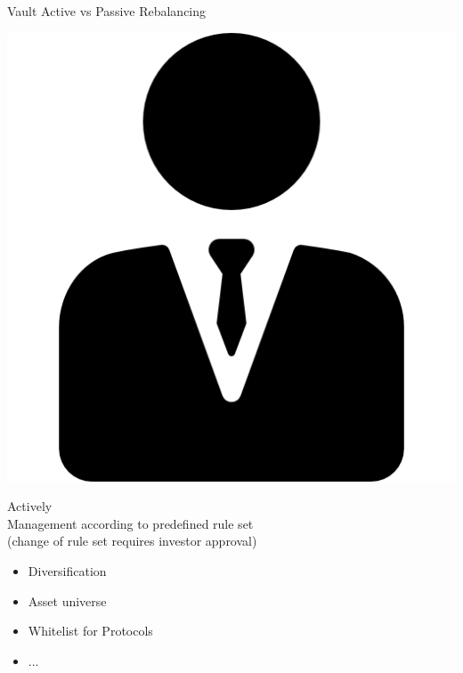 \documentclass[handout]{beamer}
\begin{document}
\begin{frame}{Vault Active vs Passive Rebalancing}
	\begin{minipage}{0.4\textwidth}
		\begin{center}
			\includegraphics[scale=0.18]{../assets/images/manager.png}
		\end{center}
		\begin{center}
		Actively \\ \vspace{1em}
		Management according to predefined rule set \\ {\footnotesize (change of rule set requires investor approval)}
\vspace{0.5em}		
			\begin{scriptsize}
				\begin{itemize}
					\item<1-> Diversification
					\item<2-> Asset universe
					\item<3-> Whitelist for Protocols
					\item<4-> ...
				\end{itemize}		
			\end{scriptsize}
		\end{center}		
	\end{minipage}
	\hfill
	\begin{minipage}{0.4\textwidth}

\end{minipage}
\end{frame}
\end{document}
